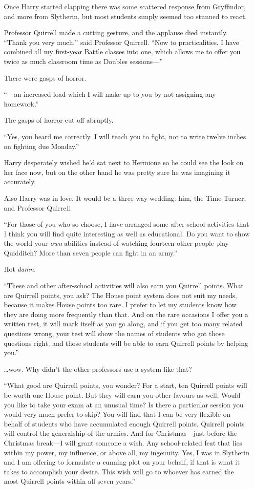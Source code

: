 Once Harry started clapping there was some scattered response from Gryffindor, and more from Slytherin, but most students simply seemed too stunned to react.

Professor Quirrell made a cutting gesture, and the applause died instantly. “Thank you very much,” said Professor Quirrell. “Now to practicalities. I have combined all my first-year Battle classes into one, which allows me to offer you twice as much classroom time as Doubles sessions—”

There were gasps of horror.

“—an increased load which I will make up to you by not assigning any homework.”

The gasps of horror cut off abruptly.

“Yes, you heard me correctly. I will teach you to fight, not to write twelve inches on fighting due Monday.”

Harry desperately wished he’d sat next to Hermione so he could see the look on her face now, but on the other hand he was pretty sure he was imagining it accurately.

Also Harry was in love. It would be a three-way wedding: him, the Time-Turner, and Professor Quirrell.

“For those of you who so choose, I have arranged some after-school activities that I think you will find quite interesting as well as educational. Do you want to show the world your \emph{own} abilities instead of watching fourteen other people play Quidditch? More than seven people can fight in an army.”

Hot \emph{damn}.

“These and other after-school activities will also earn you Quirrell points. What are Quirrell points, you ask? The House point system does not suit my needs, because it makes House points too rare. I prefer to let my students know how they are doing more frequently than that. And on the rare occasions I offer you a written test, it will mark itself as you go along, and if you get too many related questions wrong, your test will show the names of students who got those questions right, and those students will be able to earn Quirrell points by helping you.”

…wow. Why didn’t the other professors use a system like that?

“What good are Quirrell points, you wonder? For a start, ten Quirrell points will be worth one House point. But they will earn you other favours as well. Would you like to take your exam at an unusual time? Is there a particular session you would very much prefer to skip? You will find that I can be very flexible on behalf of students who have accumulated enough Quirrell points. Quirrell points will control the generalship of the armies. And for Christmas—just before the Christmas break—I will grant someone a wish. Any school-related feat that lies within my power, my influence, or above all, my ingenuity. Yes, I was in Slytherin and I am offering to formulate a cunning plot on your behalf, if that is what it takes to accomplish your desire. This wish will go to whoever has earned the most Quirrell points within all seven years.”

